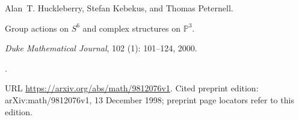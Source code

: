 Alan~T. Huckleberry, Stefan Kebekus, and Thomas Peternell.

\newblock Group actions on {$S^6$} and complex structures on {$\mathbb P^3$}.

\newblock \emph{Duke Mathematical Journal}, 102 (1):
  101--124, 2000.

\newblock {}.

\newblock URL \url{https://arxiv.org/abs/math/9812076v1}.
\newblock Cited preprint edition: arXiv:math/9812076v1, 13 December 1998;
preprint page locators refer to this edition.

